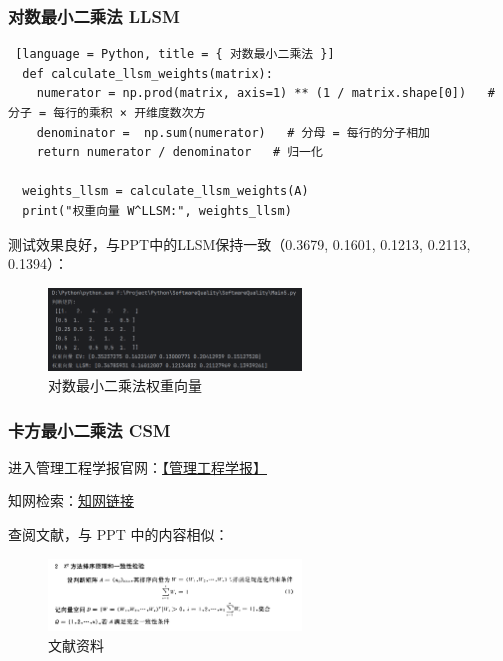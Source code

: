 \subsubsection{对数最小二乘法 \textbf{LLSM}}

\begin{lstlisting} [language = Python, title = { 对数最小二乘法 }]
  def calculate_llsm_weights(matrix):
    numerator = np.prod(matrix, axis=1) ** (1 / matrix.shape[0])   # 分子 = 每行的乘积 × 开维度数次方
    denominator =  np.sum(numerator)   # 分母 = 每行的分子相加
    return numerator / denominator   # 归一化

  weights_llsm = calculate_llsm_weights(A)
  print("权重向量 W^LLSM:", weights_llsm)
\end{lstlisting}

测试效果良好，与PPT中的LLSM保持一致（0.3679, 0.1601, 0.1213, 0.2113, 0.1394）：

\begin{figure}[H]
  \centering
  \includegraphics[width=0.6\textwidth]{img6/LLSMtest.png}
  \caption{对数最小二乘法权重向量}
\end{figure}

\subsubsection{卡方最小二乘法 \textbf{CSM}}

进入管理工程学报官网：\href{https://www.glgu.cbpt.cnki.net/WKG/WebPublication/wkTextContent.aspx?colType=4&yt=1994&st=01}{\underline{【管理工程学报】}}

知网检索：\href{https://kns.cnki.net/kcms2/article/abstract?v=pTDtInUJxYxjLD-7s1Jr5y1UuhV5yh60BdrEVEATp-rpr_LPiTYW74uV-MNF2f0Lr_QQDIvIRH5f-yqgGhgHumdqhClTNQyFcb65NEN6wwlrWuB-p4QMNaZegyN3DbXkOGmBu33PW1VPaiz8nddOdvkcMid0j-5daXosKJTzHSxUVCOpVL__ow==&uniplatform=NZKPT&language=CHS}{\underline{知网链接}}

查阅文献，与 PPT 中的内容相似：

\begin{figure}[H]
  \centering
  \includegraphics[width=0.6\textwidth]{img6/CSM.png}
  \caption{文献资料}
\end{figure}

